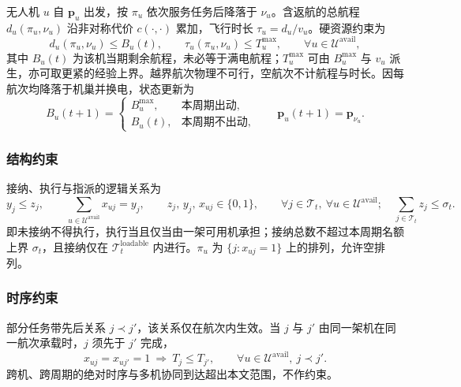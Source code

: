 无人机 $u$ 自 $\bm{p}_u$ 出发，按 $\pi_u$ 依次服务任务后降落于 $\nu_u$。含返航的总航程 $d_u(\pi_u,\nu_u)$ 沿非对称代价 $c(\cdot,\cdot)$ 累加，飞行时长 $\tau_u=d_u/v_u$。硬资源约束为
\begin{equation}
      d_u(\pi_u,\nu_u) \le B_u(t),
      \qquad
      \tau_u(\pi_u,\nu_u) \le T_u^{\max},
      \qquad \forall u\in\mathcal{U}^{\mathrm{avail}},
      \label{eq:range_time}
\end{equation}
其中 $B_u(t)$ 为该机当期剩余航程，未必等于满电航程；$T_u^{\max}$ 可由 $B_u^{\max}$ 与 $v_u$ 派生，亦可取更紧的经验上界。越界航次物理不可行，空航次不计航程与时长。因每航次均降落于机巢并换电，状态更新为
\begin{equation}
      B_u(t+1)=
      \begin{cases}
            B_u^{\max}, & \text{本周期出动},  \\
            B_u(t),     & \text{本周期不出动},
      \end{cases}
      \qquad
      \bm{p}_u(t+1)=\bm{p}_{\nu_u}.
      \label{eq:range_update}
\end{equation}

\subsubsection*{结构约束}

接纳、执行与指派的逻辑关系为
\begin{equation}
      y_j \le z_j, \qquad
      \sum_{u\in\mathcal{U}^{\mathrm{avail}}} x_{uj} = y_j,
      \qquad
      z_j,\, y_j,\, x_{uj}\in\{0,1\},
      \qquad \forall j\in\mathcal{T}_t,\ \forall u\in\mathcal{U}^{\mathrm{avail}};
      \quad
      \sum_{j\in\mathcal{T}_t} z_j \le \sigma_t.
      \label{eq:assign_link}
\end{equation}
即未接纳不得执行，执行当且仅当由一架可用机承担；接纳总数不超过本周期名额上界 $\sigma_t$，且接纳仅在 $\mathcal{T}_t^{\mathrm{loadable}}$ 内进行。$\pi_u$ 为 $\{j:x_{uj}=1\}$ 上的排列，允许空排列。

\subsubsection*{时序约束}

部分任务带先后关系 $j\prec j'$，该关系仅在航次内生效。当 $j$ 与 $j'$ 由同一架机在同一航次承载时，$j$ 须先于 $j'$ 完成，
\begin{equation}
      x_{uj}=x_{uj'}=1\ \Longrightarrow\ T_j\le T_{j'},\qquad
      \forall u\in\mathcal{U}^{\mathrm{avail}},\ j\prec j'.
      \label{eq:prec_order}
\end{equation}
跨机、跨周期的绝对时序与多机协同到达超出本文范围，不作约束。

